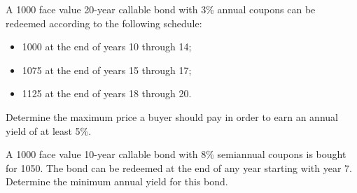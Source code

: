 \documentclass[12pt,a4paper]{article}
\begin{document}
\begin{question} A 1000 face value 20-year callable bond with 3\% annual coupons can be redeemed according to the following schedule:
\begin{itemize}
	\item 1000 at the end of years 10 through 14;
	\item 1075 at the end of years 15 through 17;
	\item 1125 at the end of years 18 through 20.
\end{itemize}
Determine the maximum price a buyer should pay in order to earn an annual yield of at least 5\%.
\end{question}
%	
%	
%	
%	
%	
%	

\begin{question} A 1000 face value 10-year callable bond with 8\% semiannual coupons is bought for 1050.  The bond can be redeemed at the end of any year starting with year 7.  Determine the minimum annual yield for this bond.
\end{question}
%	
\end{document}
